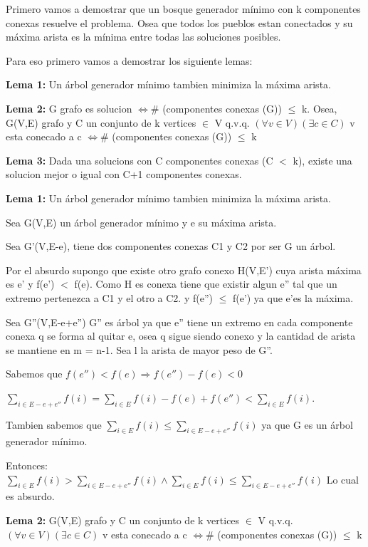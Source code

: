Primero vamos a demostrar que un bosque generador mínimo con k componentes conexas resuelve el problema. Osea que todos los pueblos estan conectados y su máxima arista es la mínima entre todas las soluciones posibles.

Para eso primero vamos a demostrar los siguiente lemas:

\textbf{Lema 1:} Un árbol generador mínimo tambien minimiza la máxima arista.

\textbf{Lema 2:} G grafo es solucion $\Leftrightarrow \#$ (componentes conexas (G)) $\leq$ k. Osea,  G(V,E) grafo y C un conjunto de k vertices $\in $ V q.v.q. $(\forall v \in V)(\exists c \in C)$ v esta conecado a c $\Leftrightarrow \#$ (componentes conexas (G)) $\leq$ k

\textbf{Lema 3:} Dada una solucions con C componentes conexas (C $<$ k), existe una solucion mejor o igual con C+1 componentes conexas.


\textbf{Lema 1:} Un árbol generador mínimo tambien minimiza la máxima arista.

Sea G(V,E) un árbol generador mínimo y e su máxima arista.

Sea G'(V,E-e), tiene dos componentes conexas C1 y C2 por ser G un árbol.

Por el absurdo supongo que existe otro grafo conexo H(V,E') cuya arista máxima es e' y f(e') $<$ f(e).
Como H es conexa tiene que existir algun e'' tal que un extremo pertenezca a C1 y el otro a C2. y f(e'') $\leq$ f(e') ya que e'es la máxima.

Sea G''(V,E-e+e'') G'' es árbol ya que e'' tiene un extremo en cada componente conexa q se forma al quitar e, osea q sigue siendo conexo y la cantidad de arista se mantiene en m = n-1. Sea l la arista de mayor peso de G''.

Sabemos que $f(e'') < f(e) \Rightarrow f(e'') - f(e) < 0$

$\sum_{i \in E-e+e''} f(i) = \sum_{i \in E} f(i) - f(e) + f(e'') < \sum_{i \in E} f(i)$.

Tambien sabemos que $\sum_{i \in E} f(i) \leq \sum_{i \in E-e+e''} f(i)$ ya que G es un árbol generador mínimo.

Entonces: $\sum_{i \in E} f(i) > \sum_{i \in E-e+e''} f(i) \wedge \sum_{i \in E} f(i) \leq \sum_{i \in E-e+e''} f(i)$
Lo cual es absurdo.

\textbf{Lema 2:} G(V,E) grafo y C un conjunto de k vertices $\in $ V q.v.q. $(\forall v \in V)(\exists c \in C)$ v esta conecado a c $\Leftrightarrow \#$ (componentes conexas (G)) $\leq$ k

